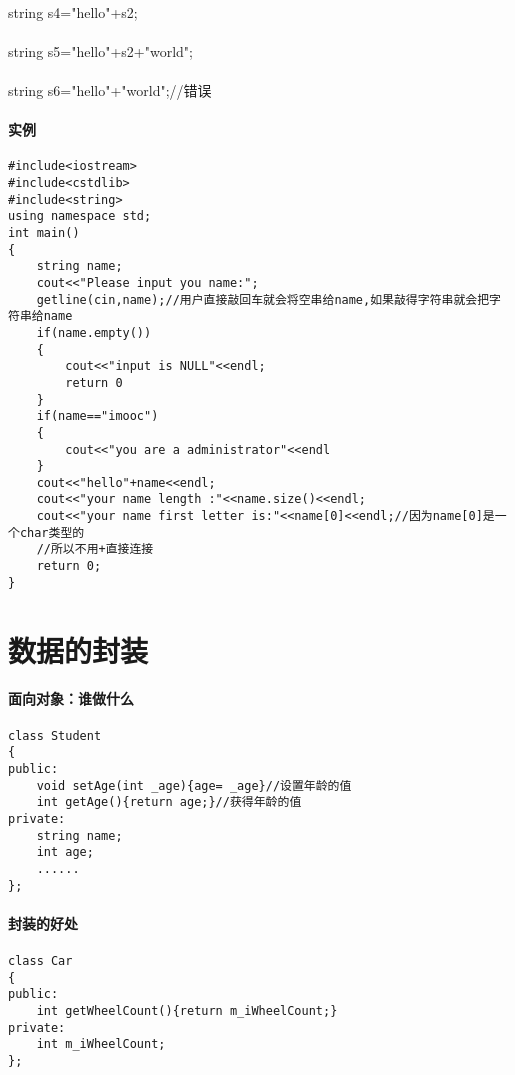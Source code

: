 \documentclass{article}
\begin{document}
\begin{CJK}{UTF8}{gbsn}
\paragraph{}
string s4="hello"+s2;
\paragraph{}
string s5="hello"+s2+"world";
\paragraph{}
string s6="hello"+"world";//错误
\paragraph{实例}
\begin{verbatim}
#include<iostream>
#include<cstdlib>
#include<string>
using namespace std;
int main()
{
	string name;
	cout<<"Please input you name:";
	getline(cin,name);//用户直接敲回车就会将空串给name,如果敲得字符串就会把字符串给name
	if(name.empty())
	{
	    cout<<"input is NULL"<<endl;
		return 0
	}
	if(name=="imooc")
	{
		cout<<"you are a administrator"<<endl
	} 
	cout<<"hello"+name<<endl;
	cout<<"your name length :"<<name.size()<<endl;
	cout<<"your name first letter is:"<<name[0]<<endl;//因为name[0]是一个char类型的
	//所以不用+直接连接
	return 0;
}
\end{verbatim}
\section{数据的封装}
\paragraph{面向对象：谁做什么}
\begin{verbatim}
class Student
{
public:
	void setAge(int _age){age= _age}//设置年龄的值
	int getAge(){return age;}//获得年龄的值
private:
	string name;
	int age;
	......
};
\end{verbatim}
\paragraph{封装的好处}
\paragraph{}
\begin{verbatim}
class Car
{
public:
	int getWheelCount(){return m_iWheelCount;}
private:
	int m_iWheelCount;
};
\end{verbatim}

\end{CJK}
\end{document}
